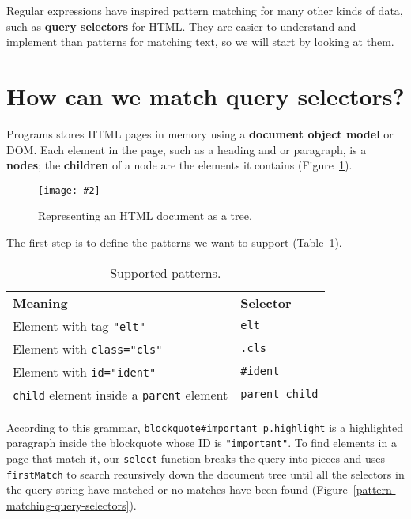 \documentclass[krantzl]{krantz}
\newcommand{\figpdf}[4]{\begin{figure}%
\centering%
\texttt{[image: \#2]}%
\caption{#3}%
\label{#1}%
\end{figure}}
\newcommand{\figref}[1]{Figure~\ref{#1}}
\newcommand{\tblref}[1]{Table~\ref{#1}}
\newcommand{\glossref}[1]{\textbf{#1}}
\begin{document}
Regular expressions have inspired pattern matching for many other kinds of data,
such as \glossref{query selectors} for HTML.
They are easier to understand and implement than patterns for matching text,
so we will start by looking at them.

\section{How can we match query selectors?}\label{pattern-matching-selectors}


Programs stores HTML pages in memory using a \glossref{document object model} or DOM.
Each element in the page,
such as a heading and or paragraph,
is a \glossref{nodes};
the \glossref{children} of a node are the elements it contains
(\figref{pattern-matching-dom-tree}).

\figpdf{pattern-matching-dom-tree}{./pattern-matching/dom-tree.pdf}{Representing an HTML document as a tree.}{0.6}


The first step is to define the patterns we want to support
(\tblref{pattern-matching-supported}).

\begin{table}
\begin{tabular}{ll}
\textbf{\underline{Meaning}} & \textbf{\underline{Selector}} \\
Element with tag \texttt{"elt"} & \texttt{elt} \\
Element with \texttt{class="cls"} & \texttt{.cls} \\
Element with \texttt{id="ident"} & \texttt{\#ident} \\
\texttt{child} element inside a \texttt{parent} element & \texttt{parent child} \\
\end{tabular}
\caption{Supported patterns.}
\label{pattern-matching-supported}
\end{table}



According to this grammar,
\texttt{blockquote\#important p.highlight} is a highlighted paragraph inside the blockquote whose ID is \texttt{"important"}.
To find elements in a page that match it,
our \texttt{select} function breaks the query into pieces
and uses \texttt{firstMatch} to search recursively down the document tree
until all the selectors in the query string have matched or no matches have been found
(\figref{pattern-matching-query-selectors}).
\end{document}
